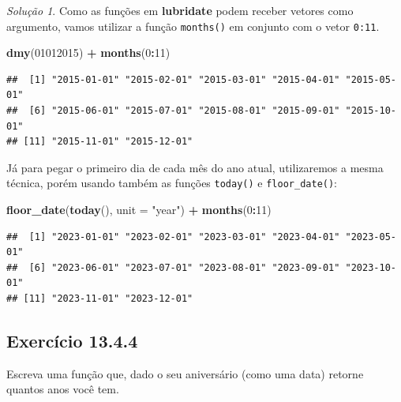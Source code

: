 \documentclass[
]{latex/krantz}
\newenvironment{Shaded}{\begin{snugshade}}{\end{snugshade}}
\newcommand{\AttributeTok}[1]{\textcolor[rgb]{0.13,0.29,0.53}{#1}}
\newcommand{\DecValTok}[1]{\textcolor[rgb]{0.00,0.00,0.81}{#1}}
\newcommand{\FunctionTok}[1]{\textcolor[rgb]{0.13,0.29,0.53}{\textbf{#1}}}
\newcommand{\NormalTok}[1]{#1}
\newcommand{\SpecialCharTok}[1]{\textcolor[rgb]{0.81,0.36,0.00}{\textbf{#1}}}
\newcommand{\StringTok}[1]{\textcolor[rgb]{0.31,0.60,0.02}{#1}}
\theoremstyle{definition}
\theoremstyle{definition}
\theoremstyle{definition}
\theoremstyle{definition}
\theoremstyle{remark}
\newtheorem*{solution}{Solução}
\begin{document}
\begin{solution}

Como as funções em \textbf{lubridate} podem receber vetores como argumento, vamos utilizar a função \texttt{months()} em conjunto com o vetor \texttt{0:11}.

\begin{Shaded}
\begin{Highlighting}[]
\FunctionTok{dmy}\NormalTok{(}\DecValTok{01012015}\NormalTok{) }\SpecialCharTok{+} \FunctionTok{months}\NormalTok{(}\DecValTok{0}\SpecialCharTok{:}\DecValTok{11}\NormalTok{)}
\end{Highlighting}
\end{Shaded}

\begin{verbatim}
##  [1] "2015-01-01" "2015-02-01" "2015-03-01" "2015-04-01" "2015-05-01"
##  [6] "2015-06-01" "2015-07-01" "2015-08-01" "2015-09-01" "2015-10-01"
## [11] "2015-11-01" "2015-12-01"
\end{verbatim}

Já para pegar o primeiro dia de cada mês do ano atual, utilizaremos a mesma técnica, porém usando também as funções \texttt{today()} e \texttt{floor\_date()}:

\begin{Shaded}
\begin{Highlighting}[]
\FunctionTok{floor\_date}\NormalTok{(}\FunctionTok{today}\NormalTok{(), }\AttributeTok{unit =} \StringTok{"year"}\NormalTok{) }\SpecialCharTok{+} \FunctionTok{months}\NormalTok{(}\DecValTok{0}\SpecialCharTok{:}\DecValTok{11}\NormalTok{)}
\end{Highlighting}
\end{Shaded}

\begin{verbatim}
##  [1] "2023-01-01" "2023-02-01" "2023-03-01" "2023-04-01" "2023-05-01"
##  [6] "2023-06-01" "2023-07-01" "2023-08-01" "2023-09-01" "2023-10-01"
## [11] "2023-11-01" "2023-12-01"
\end{verbatim}

\end{solution}

\hypertarget{exr13-4-4}{%
\subsection*{Exercício 13.4.4}\label{exr13-4-4}}

Escreva uma função que, dado o seu aniversário (como uma data) retorne quantos anos você tem.
\end{document}
